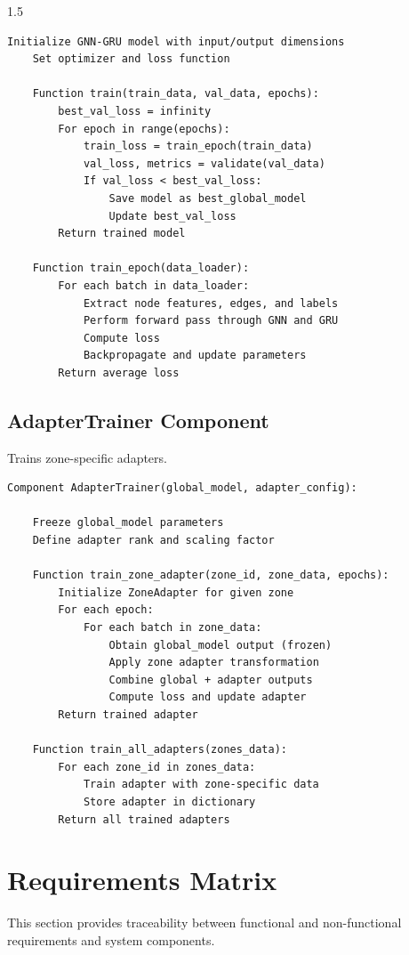 \begin{spacing}{1.5}
\begin{lstlisting}[basicstyle=\ttfamily\small, breaklines=true, frame=single]
    Initialize GNN-GRU model with input/output dimensions
    Set optimizer and loss function

    Function train(train_data, val_data, epochs):
        best_val_loss = infinity
        For epoch in range(epochs):
            train_loss = train_epoch(train_data)
            val_loss, metrics = validate(val_data)
            If val_loss < best_val_loss:
                Save model as best_global_model
                Update best_val_loss
        Return trained model

    Function train_epoch(data_loader):
        For each batch in data_loader:
            Extract node features, edges, and labels
            Perform forward pass through GNN and GRU
            Compute loss
            Backpropagate and update parameters
        Return average loss
\end{lstlisting}


\subsection{AdapterTrainer Component}

Trains zone-specific adapters.

\begin{lstlisting}[basicstyle=\ttfamily\small, breaklines=true, frame=single]
Component AdapterTrainer(global_model, adapter_config):

    Freeze global_model parameters
    Define adapter rank and scaling factor

    Function train_zone_adapter(zone_id, zone_data, epochs):
        Initialize ZoneAdapter for given zone
        For each epoch:
            For each batch in zone_data:
                Obtain global_model output (frozen)
                Apply zone adapter transformation
                Combine global + adapter outputs
                Compute loss and update adapter
        Return trained adapter

    Function train_all_adapters(zones_data):
        For each zone_id in zones_data:
            Train adapter with zone-specific data
            Store adapter in dictionary
        Return all trained adapters
\end{lstlisting}


\newpage
\section{Requirements Matrix}


This section provides traceability between functional and non-functional requirements and system components.


\end{spacing}
